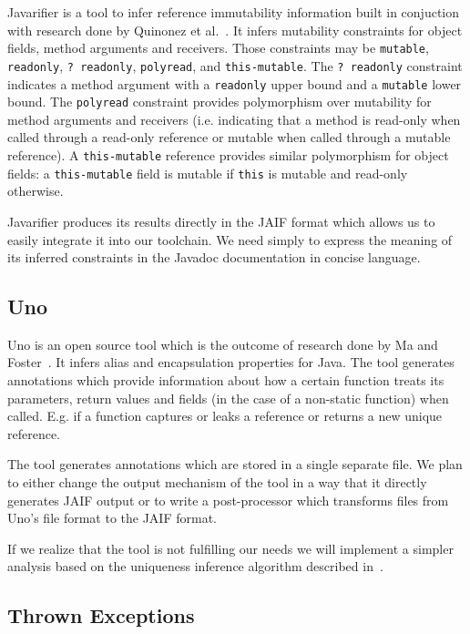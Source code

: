 Javarifier is a tool to infer reference immutability information built in
conjuction with research done by Quinonez et al.~\cite{Javarifier}. It infers
mutability constraints for object fields, method arguments and receivers. Those
constraints may be \texttt{mutable}, \texttt{readonly}, \texttt{?~readonly},
\texttt{polyread}, and \texttt{this-mutable}. The \texttt{?~readonly}
constraint indicates a method argument with a \texttt{readonly} upper bound and
a \texttt{mutable} lower bound. The \texttt{polyread} constraint provides
polymorphism over mutability for method arguments and receivers
(i.e. indicating that a method is read-only when called through a read-only
reference or mutable when called through a mutable reference). A
\texttt{this-mutable} reference provides similar polymorphism for object
fields: a \texttt{this-mutable} field is mutable if \texttt{this} is mutable
and read-only otherwise.

Javarifier produces its results directly in the JAIF format which allows us to
easily integrate it into our toolchain. We need simply to express the meaning
of its inferred constraints in the Javadoc documentation in concise language.

\subsection{Uno}

Uno is an open source tool which is the outcome of research done by Ma and
Foster~\cite{Uno}. It infers alias and encapsulation properties for Java.  The
tool generates annotations which provide information about how a certain
function treats its parameters, return values and fields (in the case of a
non-static function) when called. E.g. if a function captures or leaks a
reference or returns a new unique reference.

The tool generates annotations which are stored in a single separate file. We
plan to either change the output mechanism of the tool in a way that it
directly generates JAIF output or to write a post-processor which transforms
files from Uno's file format to the JAIF format.

If we realize that the tool is not fulfilling our needs we will implement a
simpler analysis based on the uniqueness inference algorithm described
in~\cite{UniquenessInference}.

\subsection{Thrown Exceptions}

